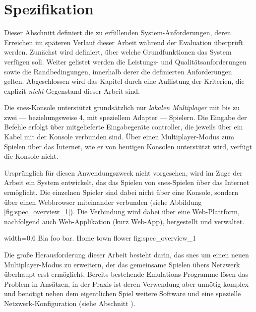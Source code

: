 \chapter{Spezifikation}\label{spezifikation}

Dieser Abschnitt definiert die zu erfüllenden System-Anforderungen,
deren Erreichen im späteren Verlauf dieser Arbeit während der Evaluation
überprüft werden. Zunächst wird definiert, über welche Grundfunktionen
das System verfügen soll. Weiter gelistet werden die Leistungs- und
Qualitätsanforderungen sowie die Randbedingungen, innerhalb derer die
definierten Anforderungen gelten. Abgeschlossen wird das Kapitel durch
eine Auflistung der Kriterien, die explizit \emph{nicht} Gegenstand
dieser Arbeit sind.

\newpage


Die \gls{snes}-Konsole unterstützt grundsätzlich nur \emph{lokalen
Multiplayer} mit bis zu zwei --- beziehungsweise 4, mit speziellem
Adapter --- Spielern. Die Eingabe der Befehle erfolgt über mitgelieferte
Eingabegeräte \gls{controller}, die jeweils über ein Kabel mit der
Konsole verbunden sind. Über einen Multiplayer-Modus zum Spielen über
das Internet, wie er von heutigen Konsolen unterstützt wird, verfügt die
Konsole nicht.

Ursprünglich für diesen Anwendungszweck nicht vorgesehen, wird im Zuge
der Arbeit ein System entwickelt, das das Spielen von \gls{snes}-Spielen
über das Internet ermöglicht. Die einzelnen Spieler sind dabei nicht
über eine Konsole, sondern über einen Webbrowser miteinander verbunden
(siehe Abbildung \ref{fig:spec_overview_1}). Die Verbindung wird dabei
über eine Web-Plattform, nachfolgend auch Web-Applikation (kurz
Web-App), hergestellt und verwaltet.

   {width=0.6\textwidth}
   {Bla foo bar.}
   {Home town flower}
   {fig:spec_overview_1}

Die große Herausforderung dieser Arbeit besteht darin, das \gls{snes} um
einen neuen Multiplayer-Modus zu erweitern, der das gemeinsame Spielen
übers Netzwerk überhaupt erst ermöglicht. Bereits bestehende
Emulations-Programme lösen das Problem in Ansätzen, in der Praxis ist
deren Verwendung aber unnötig komplex und benötigt neben dem
eigentlichen Spiel weitere Software und eine spezielle
Netzwerk-Konfiguration (siehe Abschnitt \todo{}).

